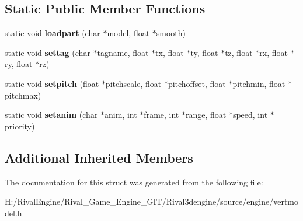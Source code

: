 \subsection*{Static Public Member Functions}
\begin{DoxyCompactItemize}
\item 
\mbox{\label{structvertcommands_aba6f879bebd19d5f87691d1fcca904f4}} 
static void {\bfseries loadpart} (char $\ast$\hyperlink{structmodel}{model}, float $\ast$smooth)
\item 
\mbox{\label{structvertcommands_a189a268e6fb3b8e16d3cc5b5438bb5c3}} 
static void {\bfseries settag} (char $\ast$tagname, float $\ast$tx, float $\ast$ty, float $\ast$tz, float $\ast$rx, float $\ast$ry, float $\ast$rz)
\item 
\mbox{\label{structvertcommands_a664089de3a6c1ba3110401e37e9dfb5c}} 
static void {\bfseries setpitch} (float $\ast$pitchscale, float $\ast$pitchoffset, float $\ast$pitchmin, float $\ast$pitchmax)
\item 
\mbox{\label{structvertcommands_aa2a87bdce064dce5781ff9b4b815d57b}} 
static void {\bfseries setanim} (char $\ast$anim, int $\ast$frame, int $\ast$range, float $\ast$speed, int $\ast$priority)
\end{DoxyCompactItemize}
\subsection*{Additional Inherited Members}


The documentation for this struct was generated from the following file\+:\begin{DoxyCompactItemize}
\item 
H\+:/\+Rival\+Engine/\+Rival\+\_\+\+Game\+\_\+\+Engine\+\_\+\+G\+I\+T/\+Rival3dengine/source/engine/vertmodel.\+h\end{DoxyCompactItemize}
